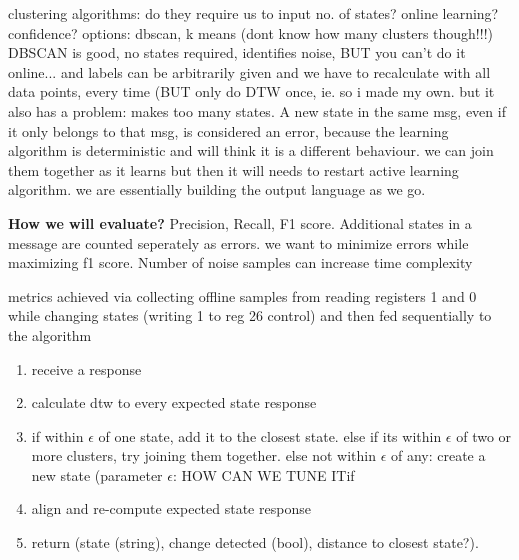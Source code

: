 \documentclass[11pt, a4paper]{article}
\begin{document}
clustering algorithms: do they require us to input no. of states? online learning? confidence?
options: dbscan, 
k means (dont know how many clusters though!!!)
DBSCAN is good, no states required, identifies noise, BUT you can't do it online... and labels can be arbitrarily given and we have to recalculate with all data points, every time (BUT only do DTW once, ie. 
so i made my own. but it also has a problem: makes too many states. A new state in the same msg, even if it only belongs to that msg, is considered an error,
because the learning algorithm is deterministic and will think it is a different behaviour.
we can join them together as it learns but then it will needs to restart active learning algorithm.
we are essentially building the output language as we go.


\textbf{How we will evaluate?}
Precision, Recall, F1 score.
Additional states in a message are counted seperately as errors. we want to minimize errors while maximizing f1 score.
Number of noise samples can increase time complexity

metrics achieved via collecting offline samples from reading registers 1 and 0 while changing states (writing 1 to reg 26 control)
and then fed sequentially to the algorithm

%

\begin{enumerate}
    \item receive a response
    \item calculate dtw to every expected state response
    \item if within $\epsilon$ of one state, add it to the closest state. else if its within $\epsilon$ of two or more clusters, try joining them together. else not within $\epsilon$ of any: create a new state (parameter $\epsilon$: HOW CAN WE TUNE ITif 
    \item align and re-compute expected state response
    \item return (state (string), change detected (bool), distance to closest state?).
\end{enumerate}
\end{document}
